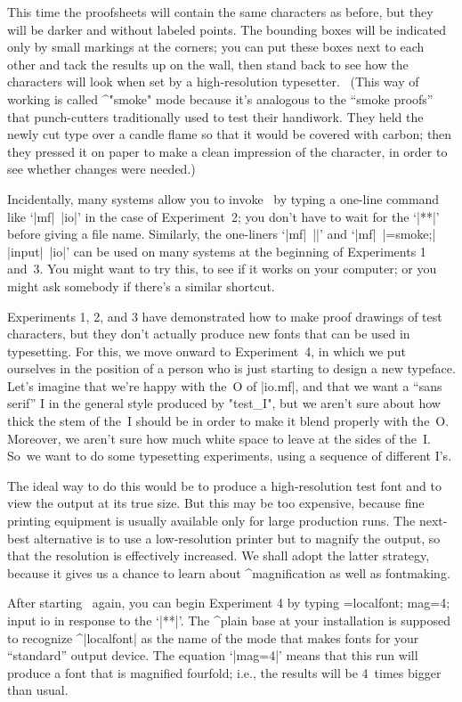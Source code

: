 This time the proofsheets will contain the same characters as before, but
they will be darker and without labeled points. The bounding boxes will
be indicated only by small markings at the corners; you can put these
boxes next to each other and tack the results up on the wall, then stand
back to see how the characters will look when set by a high-resolution
typesetter. \ (This way of working is called ^"smoke" mode because it's
analogous to the ``smoke proofs'' that punch-cutters traditionally used to
test their handiwork. They held the newly cut type over a candle flame so
that it would be covered with carbon; then they pressed it on paper to
make a clean impression of the character, in order to see whether changes
were needed.)

\danger Incidentally, many systems allow you to invoke \MF\ by typing
a one-line command like `|mf|~|io|' in the case of Experiment~2; you
don't have to wait for the `|**|' before giving a file name. Similarly,
the one-liners `|mf|~|\relax|' and `|mf|~|\mode=smoke;| |input|~|io|' can be
used on many systems at the beginning of Experiments 1 and~3. You might want
to try this, to see if it works on your computer; or you might ask
somebody if there's a similar shortcut.

Experiments 1, 2, and 3 have demonstrated how to make proof drawings of
test characters, but they don't actually produce new fonts that can be
used in typesetting. For this, we move onward to Experiment~4, in which
we put ourselves in the position of a person who is just starting to
design a new typeface. Let's imagine that we're happy with the~O of
|io.mf|, and that we want a ``sans serif'' I in the general style produced
by "test\_I", but we aren't sure about how thick the stem of the~I
should be in order to make it blend properly with the~O. Moreover, we aren't
sure how much white space to leave at the sides of the~I. So~we want to do
some typesetting experiments, using a sequence of different I's.

The ideal way to do this would be to produce a high-resolution test font and to
view the output at its true size. But this may be too expensive, because fine
printing equipment is usually available only for large production runs.
The next-best alternative is to use a low-resolution printer but to magnify
the output, so that the resolution is effectively increased. We shall adopt
the latter strategy, because it gives us a chance to learn about
^{magnification} as well as fontmaking.

After starting \MF\ again, you can begin Experiment 4 by typing
\begintt
\mode=localfont; mag=4; input io
\endtt
in response to the `|**|'. The ^{plain base} at your installation is supposed
to recognize ^|localfont| as the name of the mode that makes fonts for your
``standard'' output device. The equation `|mag=4|' means that this run will
produce a font that is magnified fourfold; i.e., the results will be
4~times bigger than usual.


